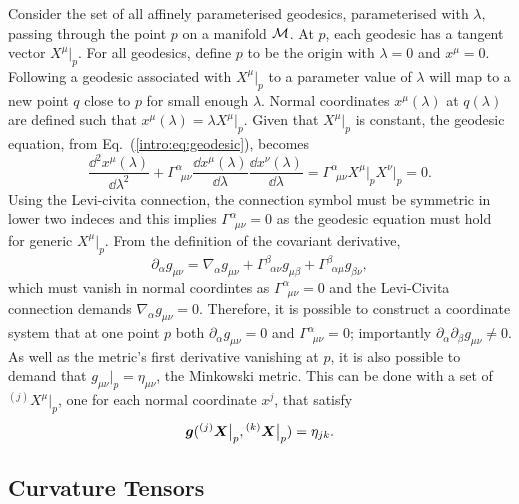 Consider the set of all affinely parameterised geodesics, parameterised with $\lambda$, passing through the point $p$ on a manifold $\mathcal{M}$. At $p$, each geodesic has a tangent vector $X^\mu\big|_p$. For all geodesics, define $p$ to be the origin with $\lambda=0$ and $x^\mu=0$. Following a geodesic associated with $X^\mu\big|_p$ to a parameter value of $\lambda$ will map to a new point $q$ close to $p$ for small enough $\lambda$. Normal coordinates $x^\mu(\lambda)$ at $q(\lambda)$ are defined such that $x^\mu(\lambda) = \lambda X^\mu\big|_p$. Given that $X^\mu\big|_p$ is constant, the geodesic equation, from Eq.~(\ref{intro:eq:geodesic}), becomes 
\begin{equation}
\frac{\dd ^2 x^\mu(\lambda)}{\dd \lambda^2} +  \Gamma^\alpha_{\,\,\,\mu\nu} \frac{\dd x^\mu(\lambda)}{\dd \lambda}  \frac{\dd x^\nu(\lambda)}{\dd \lambda} = \Gamma^\alpha_{\,\,\,\mu\nu}X^\mu\big|_p  X^\nu\big|_p =0.
\end{equation}
Using the Levi-civita connection, the connection symbol must be symmetric in lower two indeces and this implies $\Gamma^\alpha_{\,\,\,\mu\nu}=0$ as the geodesic equation must hold for generic $X^\mu\big|_p$. From the definition of the covariant derivative, 
\begin{equation}
\partial_\alpha g_{\mu\nu} = \nabla_\alpha g_{\mu\nu} + \Gamma^{\beta}_{\,\,\,\alpha\nu}g_{\mu\beta} + \Gamma^{\beta}_{\,\,\,\alpha\mu}g_{\beta \nu},
\end{equation}
which must vanish in normal coordintes as $\Gamma^\alpha_{\,\,\,\mu\nu}=0$ and the Levi-Civita connection demands $\nabla_\alpha g_{\mu\nu}=0$. Therefore, it is possible to construct a coordinate system that at one point $p$ both $\partial_\alpha g_{\mu\nu}=0$ and $\Gamma^\alpha_{\,\,\,\mu\nu}=0$; importantly $\partial_\alpha \partial_\beta g_{\mu\nu}\neq 0$. As well as the metric's first derivative vanishing at $p$, it is also possible to demand that $g_{\mu\nu}\big|_p = \eta_{\mu\nu}$, the Minkowski metric. This can be done with a set of ${}^{(j)}X^\mu \big|_p$, one for each normal coordinate $x^j$, that satisfy 
\begin{equation} \boldsymbol{g}({}^{(j)}\boldsymbol{X}\big|_p , {}^{(k)}\boldsymbol{X}\big|_p) = \eta_{jk}. \end{equation}







\subsection{Curvature Tensors}\label{intro:sec:curvature}

